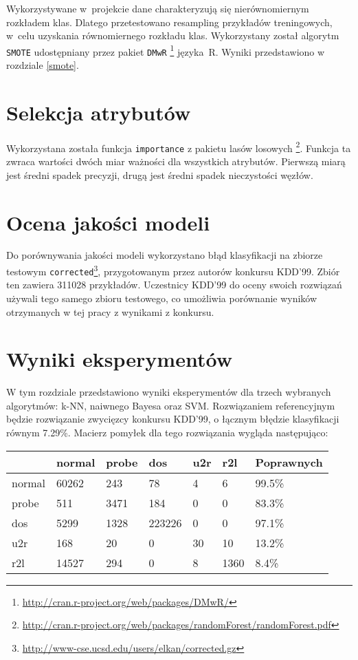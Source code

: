 \documentclass[a4paper, 12pt]{article}
\begin{document}
Wykorzystywane w~projekcie dane charakteryzują się nierównomiernym rozkładem klas. 
Dlatego przetestowano resampling przykładów treningowych, w~celu uzyskania równomiernego rozkładu klas. 
Wykorzystany został algorytm \texttt{SMOTE} udostępniany przez pakiet 
\texttt{DMwR} \footnote{\url{http://cran.r-project.org/web/packages/DMwR/}} języka~R.
Wyniki przedstawiono w rozdziale \ref{smote}.

\section{Selekcja atrybutów}
\label{sec:selekcja}

Wykorzystana została funkcja \texttt{importance} z pakietu lasów losowych
\footnote{\url{http://cran.r-project.org/web/packages/randomForest/randomForest.pdf}}.
Funkcja ta zwraca wartości dwóch miar ważności dla wszystkich atrybutów.
Pierwszą miarą jest średni spadek precyzji, drugą jest średni spadek nieczystości węzłów.


\section{Ocena jakości modeli}

Do porównywania jakości modeli wykorzystano błąd klasyfikacji na zbiorze testowym 
\texttt{corrected}\footnote{\url{http://www-cse.ucsd.edu/users/elkan/corrected.gz}},
przygotowanym przez autorów konkursu KDD'99.
Zbiór ten zawiera 311028 przykładów. 
Uczestnicy KDD'99 do oceny swoich rozwiązań używali tego samego zbioru testowego,
co umożliwia porównanie wyników otrzymanych w tej pracy z wynikami z konkursu.

\section{Wyniki eksperymentów}
\label{sec:wyniki}

W tym rozdziale przedstawiono wyniki eksperymentów dla trzech wybranych algorytmów:
k-NN, naiwnego Bayesa oraz SVM. 
Rozwiązaniem referencyjnym będzie rozwiązanie zwycięzcy konkursu KDD'99,
o łącznym błędzie klasyfikacji równym 7.29\%. Macierz pomyłek dla 
tego rozwiązania wygląda następująco:

\begin{table}[H]
\centering
\begin{tabular}{ | l | l | l | l | l | l | l | } \hline
	& normal & probe & dos 	& u2r 	& r2l 	& Poprawnych	\\ \hline
normal 	& 60262 & 243 	& 78	& 4	& 6 	& 99.5\% 	\\ \hline
probe 	& 511 	& 3471 	& 184	& 0	& 0 	& 83.3\% 	\\ \hline
dos 	& 5299 	& 1328 	& 223226& 0 	& 0 	& 97.1\% 	\\ \hline
u2r 	& 168 	& 20 	& 0	& 30	& 10	& 13.2\%	\\ \hline
r2l 	& 14527 & 294 	& 0	& 8	& 1360	& 8.4\%		\\ \hline
\end{tabular} 
\end{table}
\end{document}
